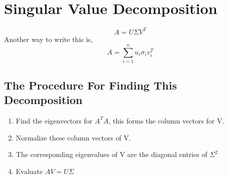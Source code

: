 \documentclass{report}
\begin{document}
\section{Singular Value Decomposition}
\[
	A = U \Sigma V^T
\]
Another way to write this is,
\[
   A = \sum_{i=1}^{n} u_i\sigma_i v^T_i
\]
\subsection{The Procedure For Finding This Decomposition}
\begin{enumerate}
   \item Find the eigenvectors for $A^TA$, this forms the column vectors for V. 
   \item Normalize these column vectors of V.
   \item The corresponding eigenvalues of V are the diagonal entries of $\Sigma^2$
   \item Evaluate $AV = U \Sigma$
\end{enumerate}
\end{document}

